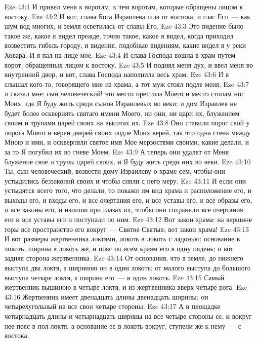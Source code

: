 \vs Eze 43:1 И привел меня к воротам, к тем воротам, которые обращены лицом к востоку.
\vs Eze 43:2 И вот, слава Бога Израилева шла от востока, и глас Его~--- как шум вод многих, и земля осветилась от славы Его.
\vs Eze 43:3 Это видение было такое же, какое я видел прежде, точно такое, какое я видел, когда приходил возвестить гибель городу, и видения, подобные видениям, какие видел я у реки Ховара. И я пал на лице мое.
\vs Eze 43:4 И слава Господа вошла в храм путем ворот, обращенных лицом к востоку.
\rsbpar\vs Eze 43:5 И поднял меня дух, и ввел меня во внутренний двор, и вот, слава Господа наполнила весь храм.
\vs Eze 43:6 И я слышал кого-то, говорящего мне из храма, а тот муж стоял подле меня,
\vs Eze 43:7 и сказал мне: сын человеческий! это место престола Моего и место стопам ног Моих, где Я буду жить среди сынов Израилевых во веки; и дом Израилев не будет более осквернять святаго имени Моего, ни они, ни цари их, блужением своим и трупами царей своих на высотах их.
\vs Eze 43:8 Они ставили порог свой у порога Моего и вереи дверей своих подле Моих верей, так что одна стена  между Мною и ими, и оскверняли святое имя Мое мерзостями своими, какие делали, и за то Я погубил их во гневе Моем.
\vs Eze 43:9 А теперь они удалят от Меня блужение свое и трупы царей своих, и Я буду жить среди них во веки.
\vs Eze 43:10 Ты, сын человеческий, возвести дому Израилеву о храме сем, чтобы они устыдились беззаконий своих и чтобы сняли с него меру.
\vs Eze 43:11 И если они устыдятся всего того, что делали, то покажи им вид храма и расположение его, и выходы его, и входы его, и все очертания его, и все уставы его, и все образы его, и все законы его, и напиши при глазах их, чтобы они сохраняли все очертания его и все уставы его и поступали по ним.
\vs Eze 43:12 Вот закон храма: на вершине горы все пространство его вокруг~--- Святое Святых; вот закон храма!
\vs Eze 43:13 И вот размеры жертвенника локтями,  локоть в локоть с ладонью: основание в локоть, ширина в локоть же, и пояс по всем краям его в одну пядень; и вот задняя сторона жертвенника.
\vs Eze 43:14 От основания, что в земле, до нижнего выступа два локтя, а шириною он в один локоть; от малого выступа до большого выступа четыре локтя, а ширина его~--- в один локоть.
\vs Eze 43:15 Самый жертвенник вышиною в четыре локтя; и из жертвенника  вверх четыре рога.
\vs Eze 43:16 Жертвенник имеет двенадцать  длины  двенадцать ширины; он четырехугольный на все свои четыре стороны.
\vs Eze 43:17 А в площадке четырнадцать  длины и четырнадцать ширины на все четыре стороны ее, и вокруг нее пояс в пол-локтя, а основание ее в локоть вокруг, ступени же к нему~--- с востока.
